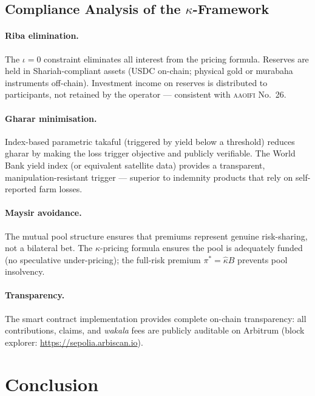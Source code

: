 \documentclass[12pt,a4paper]{article}
\newcommand{\khat}{\hat{\kappa}}
\newcommand{\wakala}{\textit{wakala}}
\newcommand{\AAOIFI}{\textsc{aaoifi}}
\begin{document}
\subsection{Compliance Analysis of the $\kappa$-Framework}

\paragraph{Riba elimination.}
The $\iota=0$ constraint eliminates all interest from the pricing formula.
Reserves are held in Shariah-compliant assets (USDC on-chain; physical gold or
murabaha instruments off-chain).
Investment income on reserves is distributed to participants, not retained by the
operator — consistent with \AAOIFI{} No.~26.

\paragraph{Gharar minimisation.}
Index-based parametric takaful (triggered by yield below a threshold) reduces
gharar by making the loss trigger objective and publicly verifiable.
The World Bank yield index (or equivalent satellite data) provides a transparent,
manipulation-resistant trigger — superior to indemnity products that rely on
self-reported farm losses.

\paragraph{Maysir avoidance.}
The mutual pool structure ensures that premiums represent genuine risk-sharing, not
a bilateral bet.
The $\kappa$-pricing formula ensures the pool is adequately funded (no speculative
under-pricing); the full-risk premium $\pi^*=\khat B$ prevents pool insolvency.

\paragraph{Transparency.}
The smart contract implementation provides complete on-chain transparency: all
contributions, claims, and \wakala{} fees are publicly auditable on Arbitrum
(block explorer: \url{https://sepolia.arbiscan.io}).

\section{Conclusion}
\label{sec:conclusion}
\end{document}

